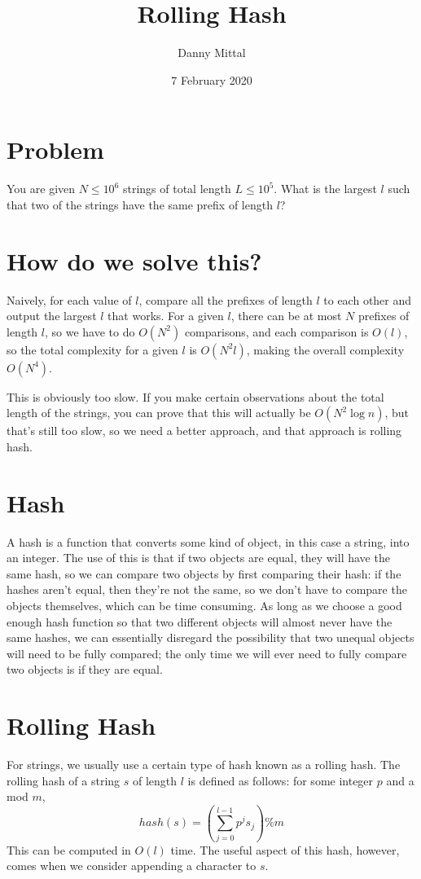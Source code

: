 \documentclass{article}
\title{Rolling Hash}
\author{Danny Mittal}
\date{7 February 2020}
\begin{document}
\maketitle

\section{Problem}
You are given $N\leq 10^6$ strings of total length $L\leq 10^5$. What is the largest $l$ such that two of the strings have the same prefix of length $l$?

\section{How do we solve this?}
Naively, for each value of $l$, compare all the prefixes of length $l$ to each other and output the largest $l$ that works. For a given $l$, there can be at most $N$ prefixes of length $l$, so we have to do $O(N^2)$ comparisons, and each comparison is $O(l)$, so the total complexity for a given $l$ is $O(N^2l)$, making the overall complexity $O(N^4)$.

This is obviously too slow. If you make certain observations about the total length of the strings, you can prove that this will actually be $O(N^2\log n)$, but that's still too slow, so we need a better approach, and that approach is rolling hash.

\section{Hash}
A hash is a function that converts some kind of object, in this case a string, into an integer. The use of this is that if two objects are equal, they will have the same hash, so we can compare two objects by first comparing their hash: if the hashes aren't equal, then they're not the same, so we don't have to compare the objects themselves, which can be time consuming. As long as we choose a good enough hash function so that two different objects will almost never have the same hashes, we can essentially disregard the possibility that two unequal objects will need to be fully compared; the only time we will ever need to fully compare two objects is if they are equal.

\section{Rolling Hash}
For strings, we usually use a certain type of hash known as a rolling hash. The rolling hash of a string $s$ of length $l$ is defined as follows: for some integer $p$ and a mod $m$,
$$hash(s) = (\sum_{j = 0}^{l - 1}p^j s_j) \% m$$
This can be computed in $O(l)$ time. The useful aspect of this hash, however, comes when we consider appending a character to $s$.
\end{document}
